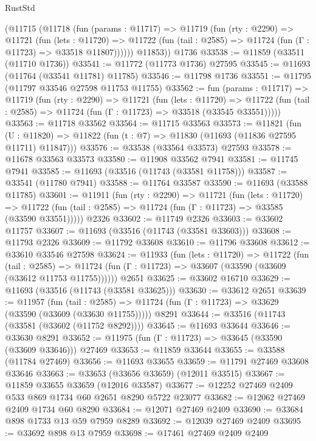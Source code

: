 \begin{lexlean}{RustStd}
\begin{coremodule}
      (@11715
        (@11718
          (fun (params : @11717) =>
          @11719
            (fun (rty : @2290) =>
            @11721
              (fun (lets : @11720) =>
              @11722 (fun (tail : @2585) => @11724 (fun (Γ : @11723) => @33518 @11807))))))
        @11853))
    @1736
@33538 := @11859 (@33511 (@11710 @1736))
@33541 := @11772 (@11773 @1736) @27595
@33545 := @11693 (@11764 (@33541 @11781) @11785)
@33546 := @11798 @1736
@33551 := @11795 (@11797 @33546 @27598 @11753 @11755)
@33562 := fun (params : @11717) =>
  @11719
    (fun (rty : @2290) =>
    @11721
      (fun (lets : @11720) =>
      @11722 (fun (tail : @2585) => @11724 (fun (Γ : @11723) => @33518 (@33545 @33551)))))
@33563 := @11718 @33562
@33564 := @11715 @33563
@33573 := @11821
    (fun (U : @11820) => @11822 (fun (t : @7) => @11830 (@11693 (@11836 @27595 @11711) @11847)))
@33576 := @33538 (@33564 @33573) @27593
@33578 := @11678 @33563 @33573
@33580 := @11908 @33562 @7941
@33581 := @11745 @7941
@33585 := @11693 (@33516 (@11743 (@33581 @11758)))
@33587 := @33541 (@11780 @7941)
@33588 := @11764 @33587
@33590 := @11693 (@33588 @11785)
@33601 := @11911
    (fun (rty : @2290) =>
    @11721
      (fun (lets : @11720) =>
      @11722 (fun (tail : @2585) => @11724 (fun (Γ : @11723) => @33585 (@33590 @33551)))))
    @2326
@33602 := @11749 @2326
@33603 := @33602 @11757
@33607 := @11693 (@33516 (@11743 (@33581 @33603)))
@33608 := @11793 @2326
@33609 := @11792 @33608
@33610 := @11796 @33608
@33612 := @33610 @33546 @27598
@33624 := @11933
    (fun (lets : @11720) =>
    @11722
      (fun (tail : @2585) =>
      @11724 (fun (Γ : @11723) => @33607 (@33590 (@33609 (@33612 @11753 @11755))))))
    @2651
@33625 := @33602 @16710
@33629 := @11693 (@33516 (@11743 (@33581 @33625)))
@33630 := @33612 @2651
@33639 := @11957
    (fun (tail : @2585) => @11724 (fun (Γ : @11723) => @33629 (@33590 (@33609 (@33630 @11755)))))
    @8291
@33644 := @33516 (@11743 (@33581 (@33602 (@11752 @8292))))
@33645 := @11693 @33644
@33646 := @33630 @8291
@33652 := @11975 (fun (Γ : @11723) => @33645 (@33590 (@33609 @33646))) @27469
@33653 := @11859 @33644
@33655 := @33588 (@11784 @27469)
@33656 := @11693 @33655
@33659 := @11791 @27469 @33608 @33646
@33663 := @33653 (@33656 @33659) (@12011 @33515)
@33667 := @11859 @33655 @33659 (@12016 @33587)
@33677 := @12252 @27469 @2409 @533 @869 @1734 @60 @2651 @8290 @5722 @23077
@33682 := @12062 @27469 @2409 @1734 @60 @8290
@33684 := @12071 @27469 @2409
@33690 := @33684 @898 @1733 @13 @59 @7959 @8289
@33692 := @12039 @27469 @2409
@33695 := @33692 @898 @13 @7959
@33698 := @17461 @27469 @2409 @2409

\end{coremodule}
\end{lexlean}
